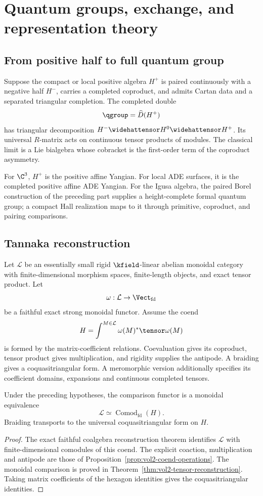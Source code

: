 \part{Quantum groups, exchange, and representation theory}

\chapter{From positive half to full quantum group}
Suppose the compact or local positive algebra $H^+$ is paired continuously with a negative half $H^-$, carries a completed coproduct, and admits Cartan data and a separated triangular completion. The completed double
\[
 \qgroup=\widehat D(H^+)
\]
has triangular decomposition $H^-\widehattensor H^0\widehattensor H^+$. Its universal $R$-matrix acts on continuous tensor products of modules. The classical limit is a Lie bialgebra whose cobracket is the first-order term of the coproduct asymmetry.

For $\C^3$, $H^+$ is the positive affine Yangian. For local ADE surfaces, it is the completed positive affine ADE Yangian. For the Igusa algebra, the paired Borel construction of the preceding part supplies a height-complete formal quantum group; a compact Hall realization maps to it through primitive, coproduct, and pairing comparisons.

\chapter{Tannaka reconstruction}
Let $\mathcal L$ be an essentially small rigid $\kfield$-linear abelian monoidal category with finite-dimensional morphism spaces, finite-length objects, and exact tensor product. Let
\[
 \omega:\mathcal L\to\Vect_{\mathrm{fd}}
\]
be a faithful exact strong monoidal functor. Assume the coend
\[
 H=\int^{M\in\mathcal L}\omega(M)^*\tensor\omega(M)
\]
is formed by the matrix-coefficient relations. Coevaluation gives its
coproduct, tensor product gives multiplication, and rigidity supplies
the antipode. A braiding gives a coquasitriangular form.
A meromorphic version additionally specifies its coefficient domains,
expansions and continuous completed tensors.

\begin{theorem}
Under the preceding hypotheses, the comparison functor is a monoidal equivalence
\[
 \mathcal L\simeq\operatorname{Comod}_{\mathrm{fd}}(H).
\]
Braiding transports to the universal coquasitriangular form on $H$.
\end{theorem}
\begin{proof}
The exact faithful coalgebra reconstruction theorem identifies
$\mathcal L$ with finite-dimensional comodules of this coend.
The explicit coaction, multiplication and antipode are those of
Proposition~\ref{prop:vol2-coend-operations}.
The monoidal comparison is proved in
Theorem~\ref{thm:vol2-tensor-reconstruction}.
Taking matrix coefficients of the hexagon identities gives the
coquasitriangular identities.
\end{proof}

